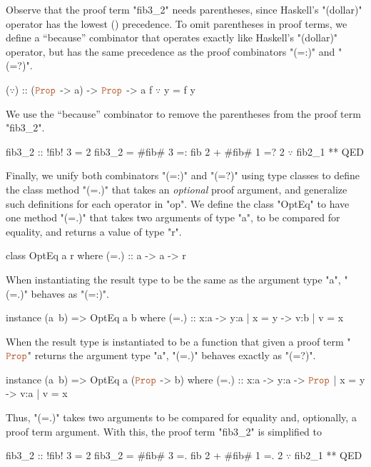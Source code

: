 Observe that the proof term "fib3_2" needs parentheses, 
since Haskell's "(dollar)" operator has the lowest () precedence. 
% 
To omit parentheses in proof terms, we define
a ``because'' combinator that operates exactly like Haskell's 
"(dollar)" operator, but has the same precedence as the proof combinators 
"(=:)" and "(=?)".
%
\begin{mcode}
    ($\because$) :: ($\typp$ -> a) -> $\typp$ -> a
    f $\because$ y = f y
\end{mcode}
%
We use the ``because'' combinator to remove the parentheses from the proof term 
"fib3_2".
%
\begin{mcode}
    fib3_2 :: { !fib! 3 = 2 }
    fib3_2 = #fib# 3 =: fib 2 + #fib# 1 =? 2 $\because$ fib2_1 ** QED
\end{mcode}

%
Finally, we unify both combinators "(=:)" and "(=?)"
using type classes to define the class method "(=.)" 
that takes an \textit{optional} proof argument, and 
generalize such definitions for each operator in "op". 
%
We define the class "OptEq" to have one method "(=.)" 
that takes two arguments of type "a", to be compared 
for equality, and returns a value of type "r". 
%
\begin{mcode}
    class OptEq a r where
      (=.) :: a -> a -> r
\end{mcode}
%
When instantiating the result type to be the same as the argument type "a", 
"(=.)" behaves as "(=:)".
\begin{mcode}
    instance (a~b) => OptEq a b where
      (=.) :: x:a -> { y:a | x = y } -> { v:b | v = x }
\end{mcode}
%
When the result type is instantiated to be 
a function that given a proof term "$\typp$"
returns the argument type "a", 
"(=.)" behaves exactly as "(=?)".
%
\begin{mcode}
    instance (a~b) => OptEq a ($\typp$ -> b) where
      (=.) :: x:a -> y:a -> { $\typp$ | x = y } -> { v:a | v = x }
\end{mcode}

Thus, "(=.)" takes two arguments to be compared for equality
and, optionally, a proof term argument. 
%
With this, the proof term "fib3_2" is simplified to  
%
\begin{mcode}
    fib3_2 :: { !fib! 3 = 2 }
    fib3_2 = #fib# 3 =. fib 2 + #fib# 1 =. 2 $\because$ fib2_1 ** QED
\end{mcode}

